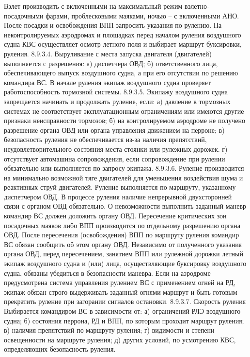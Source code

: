 Взлет производить с включенными на максимальный режим взлетно-посадочными фарами, проблесковыми маяками, ночью – с включенными АНО. 
После посадки и освобождения ВПП запросить указания по рулению. 
На неконтролируемых аэродромах и площадках перед началом руления воздушного судна КВС осуществляет осмотр летного поля и выбирает маршрут буксировки, руления. 
8.9.3.4. Выруливание с места запуска двигателя (двигателей) выполняется с разрешения: 
а)	диспетчера ОВД; 
б)	ответственного лица, обеспечивающего выпуск воздушного судна, а при его отсутствии по решению командира ВС.
В начале руления экипаж воздушного судна проверяет работоспособность тормозной системы. 
8.9.3.5. Экипажу воздушного судна запрещается начинать и продолжать руление, если: 
а)	давление в тормозных системах не соответствует эксплуатационным ограничениям или имеются другие признаки неисправности тормозов; 
б)	на контролируемом аэродроме не получено разрешение органа ОВД или органа управления движением на перроне; 
в)	безопасность руления не обеспечивается из-за наличия препятствий, неудовлетворительного состояния места стоянки или рулежных дорожек. 
г)	отсутствует автомашина сопровождения, если сопровождение при рулении обязательно или выполняется по запросу экипажа. 
8.9.3.6. Руление производится на минимально возможной тяге двигателей для уменьшения воздействия шума и реактивных струй двигателей. 
Руление выполняется по маршруту, указанному диспетчером ОВД. В процессе руления наличие непрерывной двухсторонней связи с органом ОВД обязательно. О невозможности выполнить заданный маневр командир ВС должен доложить органу ОВД. 
Пересечение критических зон посадочных маяков либо ВПП производится по отдельному разрешению органа ОВД. После пересечения (освобождения) ВПП по маршруту руления командир ВС обязан сообщить об этом органу ОВД.
Независимо от полученного указания органа ОВД, перед пересечением, занятием ВПП или рулежной дорожки летный экипаж воздушного судна и (или) лица, осуществляющие буксировку воздушного судна, обязаны убедиться в безопасности маневра.
Если на аэродроме предусмотрена система управления рулением ВС с применением огней на РД, экипаж обязан строго выдерживать заданный огнями маршрут и быть готовым прекратить руление при загорании сигналов остановки. 
8.9.3.7. Скорость руления
Выбирается командиром ВС в зависимости от: 
а)	ограничений РЛЭ воздушного судна; 
б)	состояния перрона, РД и ВПП, по которым проходит маршрут руления; 
в)	наличия препятствий по маршруту руления; 
г)	видимости и степени освещенности на маршруте руления; 
д)	других условий, по усмотрению КВС, определяющих безопасность руления. 
